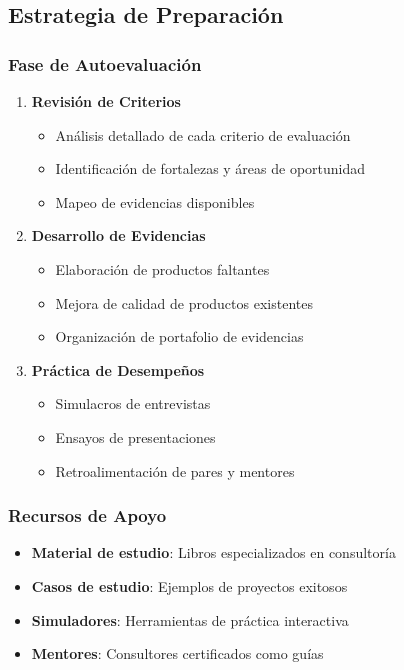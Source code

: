 \documentclass[12pt,letterpaper,oneside]{book}
\begin{document}
\subsection{Estrategia de Preparación}

\subsubsection{Fase de Autoevaluación}

\begin{enumerate}
\item \textbf{Revisión de Criterios}
   \begin{itemize}
   \item Análisis detallado de cada criterio de evaluación
   \item Identificación de fortalezas y áreas de oportunidad
   \item Mapeo de evidencias disponibles
   \end{itemize}

\item \textbf{Desarrollo de Evidencias}
   \begin{itemize}
   \item Elaboración de productos faltantes
   \item Mejora de calidad de productos existentes
   \item Organización de portafolio de evidencias
   \end{itemize}

\item \textbf{Práctica de Desempeños}
   \begin{itemize}
   \item Simulacros de entrevistas
   \item Ensayos de presentaciones
   \item Retroalimentación de pares y mentores
   \end{itemize}
\end{enumerate}

\subsubsection{Recursos de Apoyo}

\begin{itemize}
\item \textbf{Material de estudio}: Libros especializados en consultoría
\item \textbf{Casos de estudio}: Ejemplos de proyectos exitosos
\item \textbf{Simuladores}: Herramientas de práctica interactiva
\item \textbf{Mentores}: Consultores certificados como guías
\end{itemize}
\end{document}
